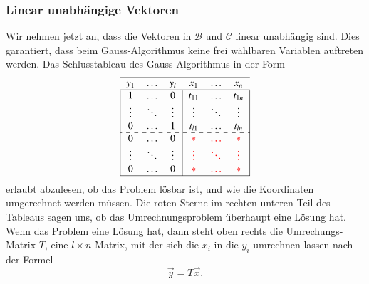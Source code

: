 \subsubsection{Linear unabhängige Vektoren}
Wir nehmen jetzt an, dass die Vektoren in $\mathcal{B}$ und
$\mathcal{C}$ linear unabhängig sind. 
Dies garantiert, dass beim Gauss-Algorithmus keine frei wählbaren Variablen
auftreten werden.
Das Schlusstableau des Gauss-Algorithmus in der Form
\[
\begin{tabular}{|>{$}c<{$}>{$}c<{$}>{$}c<{$}|>{$}c<{$}>{$}c<{$}>{$}c<{$}|}
\hline
   y_1&\dots &   y_l&   x_1&\dots &   x_n\\
\hline
1&\dots &0&t_{11}&\dots &t_{1n}\\
\vdots&\ddots&\vdots&\vdots&\ddots&\vdots\\
0&\dots &1&t_{l1}&\dots &t_{ln}\\
\hdashline
  0   &\dots &  0   &\color{red}*&\color{red}\dots&\color{red}*\\
\vdots&\ddots&\vdots&\color{red}\vdots&\color{red}\ddots&\color{red}\vdots\\
  0   &\dots &  0   &\color{red}*&\color{red}\dots&\color{red}*\\
\hline
\end{tabular}
\]
erlaubt abzulesen, ob das Problem lösbar ist, und wie die Koordinaten
umgerechnet werden müssen.
Die {\color{red}roten} Sterne im rechten unteren Teil des Tableaus sagen uns,
ob das Umrechnungsproblem überhaupt eine Lösung hat.
Wenn das Problem eine Lösung hat, dann steht oben rechts die Umrechungs-Matrix
$T$, eine $l\times n$-Matrix, mit der sich die $x_i$ in die $y_i$ umrechnen
lassen
nach der Formel
\[
\vec{y} = T\vec{x}.
\]

